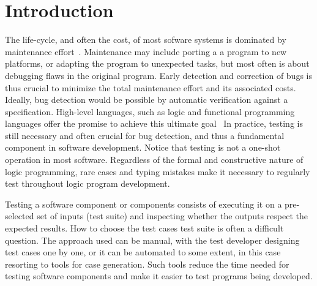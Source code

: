 
\section{Introduction}
\label{sec:intro}


The life-cycle, and often the cost, of most sofware systems is
dominated by maintenance effort~\cite{wasnik2013software, DBLP:journals/tplp/SerebrenikSD08}.
%
Maintenance may include porting a a program to new platforms, or
adapting the program to unexpected tasks, but most often is about
debugging flaws in the original program.
%
Early detection and
correction of bugs is thus crucial to minimize the total maintenance
effort and its associated costs.
%
Ideally, bug detection would be possible by automatic verification
against a specification.
%
High-level languages, such as logic and functional programming languages
offer the promise to achieve this ultimate
goal~\cite{wadler1989theorems,cortesi1997specification}
%
In practice, testing is still necessary and often crucial for bug
detection, and thus a fundamental component in software development.
%
%
Notice that testing is not a one-shot operation in most software.
%
Regardless of the formal and constructive nature of logic programming,
rare cases and typing mistakes make it necessary to regularly test
throughout logic program development.

Testing a software component or components consists of executing it on
a pre-selected set of inputs (test suite) and inspecting whether the outputs
respect the expected results.
%
%
How to choose the test cases test suite is often a difficult
question.
%
The approach used
can be  manual, with the test developer designing test cases one by
one, or it can be automated to some extent, in this case resorting to
tools for case generation.
%
Such tools reduce the time needed for testing software components and make
it easier to test programs being developed.


